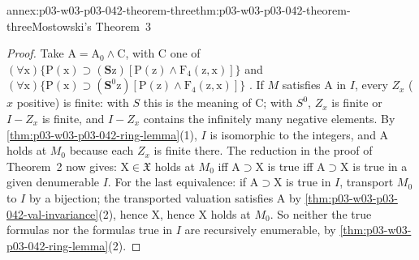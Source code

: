 \begin{annexitem}{annex:p03-w03-p03-042-theorem-three}{thm:p03-w03-p03-042-theorem-three}{Mostowski's Theorem~3}
\begin{proof}
Take \(\mathrm A=\mathrm A_0\wedge\mathrm C\), with \(\mathrm C\) one of
\((\forall\mathrm x)\{\mathrm P(\mathrm x)\supset(\mathbf S\mathrm z)
[\mathrm P(\mathrm z)\wedge\mathrm F_4(\mathrm z,\mathrm x)]\}\) and
\((\forall\mathrm x)\{\mathrm P(\mathrm x)\supset(\mathbf S^0\mathrm z)
[\mathrm P(\mathrm z)\wedge\mathrm F_4(\mathrm z,\mathrm x)]\}\)
\cite[p.~19]{Mostowski1957}.  If \(M\) satisfies \(\mathrm A\) in \(I\),
every \(Z_x\) (\(x\) positive) is finite: with \(S\) this is the meaning of
\(\mathrm C\); with \(S^0\), \(Z_x\) is finite or \(I-Z_x\) is finite,
and \(I-Z_x\) contains the infinitely many negative elements.  By
\cref{thm:p03-w03-p03-042-ring-lemma}(1), \(I\) is isomorphic to the
integers, and \(\mathrm A\) holds at \(M_0\) because each \(Z_x\) is
finite there.  The reduction in the proof of Theorem~2 now gives: \(\mathrm
X\in\mathfrak X\) holds at \(M_0\) iff \(\mathrm A\supset\mathrm X\) is
true iff \(\mathrm A\supset\mathrm X\) is true in a given denumerable
\(I\).  For the last equivalence: if \(\mathrm A\supset\mathrm X\) is true
in \(I\), transport \(M_0\) to \(I\) by a bijection; the transported
valuation satisfies \(\mathrm A\) by
\cref{thm:p03-w03-p03-042-val-invariance}(2), hence \(\mathrm X\), hence
\(\mathrm X\) holds at \(M_0\).  So neither the true formulas nor the
formulas true in \(I\) are recursively enumerable, by
\cref{thm:p03-w03-p03-042-ring-lemma}(2).
\end{proof}
\end{annexitem}

